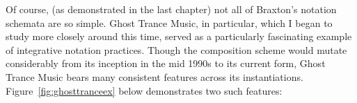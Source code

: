     Of course, (as demonstrated in the last chapter) not all of Braxton's notation schemata are so simple. Ghost Trance Music, in particular, which I began to study more closely around this time, served as a particularly fascinating example of integrative notation practices. Though the composition scheme would mutate considerably from its inception in the mid 1990s to its current form, Ghost Trance Music bears many consistent features across its instantiations.\autocite{Dicker_2016} Figure~\ref{fig:ghosttranceex} below demonstrates two such features: 
    

